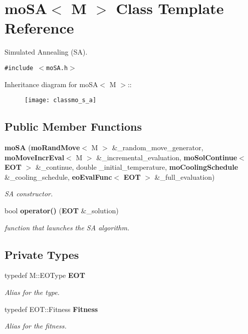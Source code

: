 \section{mo\-SA$<$ M $>$ Class Template Reference}
\label{classmo_s_a}
Simulated Annealing (SA).  


{\tt \#include $<$mo\-SA.h$>$}

Inheritance diagram for mo\-SA$<$ M $>$::\begin{figure}[H]
\begin{center}
\leavevmode
\texttt{[image: classmo\_s\_a]}
\end{center}
\end{figure}
\subsection*{Public Member Functions}
\begin{CompactItemize}
\item 
{\bf mo\-SA} ({\bf mo\-Rand\-Move}$<$ M $>$ \&\_\-random\_\-move\_\-generator, {\bf mo\-Move\-Incr\-Eval}$<$ M $>$ \&\_\-incremental\_\-evaluation, {\bf mo\-Sol\-Continue}$<$ {\bf EOT} $>$ \&\_\-continue, double \_\-initial\_\-temperature, {\bf mo\-Cooling\-Schedule} \&\_\-cooling\_\-schedule, {\bf eo\-Eval\-Func}$<$ {\bf EOT} $>$ \&\_\-full\_\-evaluation)
\begin{CompactList}\small\item\em SA constructor. \item\end{CompactList}\item 
bool {\bf operator()} ({\bf EOT} \&\_\-solution)
\begin{CompactList}\small\item\em function that launches the SA algorithm. \item\end{CompactList}\end{CompactItemize}
\subsection*{Private Types}
\begin{CompactItemize}
\item 
typedef M::EOType {\bf EOT}\label{classmo_s_a_y0}

\begin{CompactList}\small\item\em Alias for the type. \item\end{CompactList}\item 
typedef EOT::Fitness {\bf Fitness}\label{classmo_s_a_y1}

\begin{CompactList}\small\item\em Alias for the fitness. \item\end{CompactList}\end{CompactItemize}
